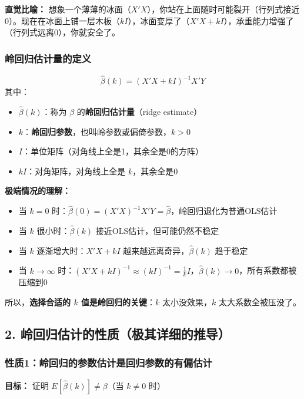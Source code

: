 \documentclass[12pt,a4paper]{ctexart}
\begin{document}
\textbf{直觉比喻：} 想象一个薄薄的冰面（$X'X$），你站在上面随时可能裂开（行列式接近0）。现在在冰面上铺一层木板（$kI$），冰面变厚了（$X'X + kI$），承重能力增强了（行列式远离0），你就安全了。

\subsubsection{岭回归估计量的定义}
\begin{equation}
\hat{\beta}(k) = (X'X + kI)^{-1}X'Y \tag{4.28}
\end{equation}
其中：
\begin{itemize}
\item $\hat{\beta}(k)$：称为 $\beta$ 的\textbf{岭回归估计量}（ridge estimate）
\item $k$：\textbf{岭回归参数}，也叫岭参数或偏倚参数，$k > 0$
\item $I$：单位矩阵（对角线上全是1，其余全是0的方阵）
\item $kI$：对角矩阵，对角线上全是 $k$，其余全是0
\end{itemize}

\textbf{极端情况的理解：}
\begin{itemize}
\item 当 $k = 0$ 时：$\hat{\beta}(0) = (X'X)^{-1}X'Y = \hat{\beta}$，岭回归退化为普通OLS估计
\item 当 $k$ 很小时：$\hat{\beta}(k)$ 接近OLS估计，但可能仍然不稳定
\item 当 $k$ 逐渐增大时：$X'X + kI$ 越来越远离奇异，$\hat{\beta}(k)$ 趋于稳定
\item 当 $k \to \infty$ 时：$(X'X + kI)^{-1} \approx (kI)^{-1} = \frac{1}{k}I$，$\hat{\beta}(k) \to 0$，所有系数都被压缩到0
\end{itemize}

所以，\textbf{选择合适的 $k$ 值是岭回归的关键}：$k$ 太小没效果，$k$ 太大系数全被压没了。

\subsection{2. 岭回归估计的性质（极其详细的推导）}

\subsubsection{性质1：岭回归的参数估计是回归参数的有偏估计}

\textbf{目标：} 证明 $E[\hat{\beta}(k)] \neq \beta$（当 $k \neq 0$ 时）
\end{document}

